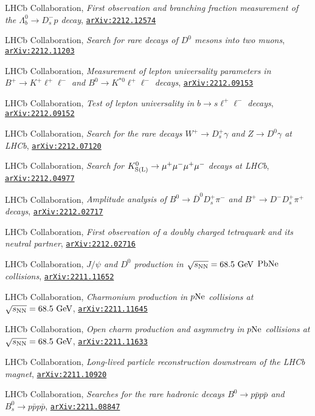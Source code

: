 \documentclass[a4paper, 11pt]{article}
\newenvironment{cvcontent}{
  \leftskip=0.5cm\rightskip=0cm
  \noindent\ignorespaces}{\par}
\newcommand{\arxiv}[1]{\href{https://arxiv.org/abs/#1}{\texttt{arXiv:#1}}}
\begin{document}
\begin{cvcontent}
\begin{enumerate}[label={[\arabic*]}, leftmargin=1.5cm]
    \item LHCb Collaboration,
    \emph{First observation and branching fraction measurement of the $\Lambda_b^0\to D_s^- p$ decay},
    \arxiv{2212.12574}
    \item LHCb Collaboration,
    \emph{Search for rare decays of $D^0$ mesons into two muons},
    \arxiv{2212.11203}
    \item LHCb Collaboration,
    \emph{Measurement of lepton universality parameters in $B^+ \to K^+ \ell^+ \ell^-$ and $B^0 \to K^{*0} \ell^+ \ell^-$ decays},
    \arxiv{2212.09153}
    \item LHCb Collaboration,
    \emph{Test of lepton universality in $b \to s \ell^+ \ell^-$ decays},
    \arxiv{2212.09152}
    \item LHCb Collaboration,
    \emph{Search for the rare decays $W^+ \to D^+_s \gamma$ and $Z \to D^0 \gamma$ at LHCb},
    \arxiv{2212.07120}
    \sloppy
    \item LHCb Collaboration,
    \emph{Search for $K^0_{\rm{S(L)}} \to \mu^+ \mu^- \mu^+ \mu^-$ decays at LHCb},
    \arxiv{2212.04977}
    \item LHCb Collaboration,
    \emph{Amplitude analysis of $B^0 \to \overline{D}^0 D_s^+ \pi^-$ and $B^+ \to D^- D_s^+ \pi^+$ decays},
    \arxiv{2212.02717}
    \item LHCb Collaboration,
    \emph{First observation of a doubly charged tetraquark and its neutral partner},
    \arxiv{2212.02716}
    \sloppy
    \item LHCb Collaboration,
    \emph{$J/\psi$ and $D^0$ production in $\sqrt{s_{\rm{NN}}} = 68.5~\rm{GeV}$ $\rm{PbNe}$ collisions},
    \arxiv{2211.11652}
    \sloppy
    \item LHCb Collaboration,
    \emph{Charmonium production in \(p\rm{Ne}\) collisions at $\sqrt{s_{\rm{NN}}} = 68.5~\rm{GeV}$},
    \arxiv{2211.11645}
    \item LHCb Collaboration,
    \emph{Open charm production and asymmetry in $p\rm{Ne}$ collisions at $\sqrt{s_{\rm{NN}}} = 68.5~\rm{GeV}$},
    \arxiv{2211.11633}
    \sloppy
    \item LHCb Collaboration,
    \emph{Long-lived particle reconstruction downstream of the LHCb magnet},
    \arxiv{2211.10920}
    \sloppy
    \item LHCb Collaboration,
    \emph{Searches for the rare hadronic decays $B^0 \rightarrow p\bar{p}p\bar{p}$ and $B^0_{s} \rightarrow p\bar{p}p\bar{p}$},
    \arxiv{2211.08847}

\end{enumerate}
\end{cvcontent}
\end{document}
